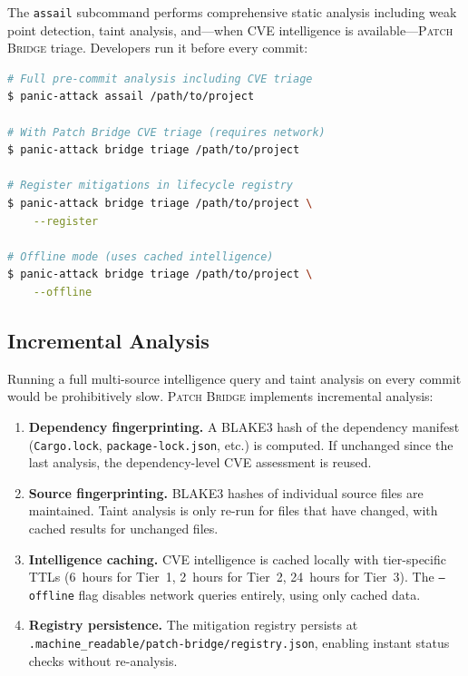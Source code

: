\documentclass[11pt,twocolumn]{article}
\begin{document}
The \texttt{assail} subcommand performs comprehensive static analysis
including weak point detection, taint analysis, and---when CVE
intelligence is available---\textsc{Patch Bridge} triage. Developers
run it before every commit:

\begin{lstlisting}[language=bash,caption={Pre-commit usage},label=lst:precommit]
# Full pre-commit analysis including CVE triage
$ panic-attack assail /path/to/project

# With Patch Bridge CVE triage (requires network)
$ panic-attack bridge triage /path/to/project

# Register mitigations in lifecycle registry
$ panic-attack bridge triage /path/to/project \
    --register

# Offline mode (uses cached intelligence)
$ panic-attack bridge triage /path/to/project \
    --offline
\end{lstlisting}

\subsection{Incremental Analysis}

Running a full multi-source intelligence query and taint analysis on
every commit would be prohibitively slow. \textsc{Patch Bridge}
implements incremental analysis:

\begin{enumerate}[nosep]
  \item \textbf{Dependency fingerprinting.} A BLAKE3 hash of the
    dependency manifest (\texttt{Cargo.lock}, \texttt{package-lock.json},
    etc.) is computed. If unchanged since the last analysis, the
    dependency-level CVE assessment is reused.
  \item \textbf{Source fingerprinting.} BLAKE3 hashes of individual
    source files are maintained. Taint analysis is only re-run for
    files that have changed, with cached results for unchanged files.
  \item \textbf{Intelligence caching.} CVE intelligence is cached
    locally with tier-specific TTLs (6~hours for Tier~1, 2~hours for
    Tier~2, 24~hours for Tier~3). The \texttt{--offline} flag disables
    network queries entirely, using only cached data.
  \item \textbf{Registry persistence.} The mitigation registry
    persists at \texttt{.machine\_readable/patch-bridge/registry.json},
    enabling instant status checks without re-analysis.
\end{enumerate}
\end{document}
